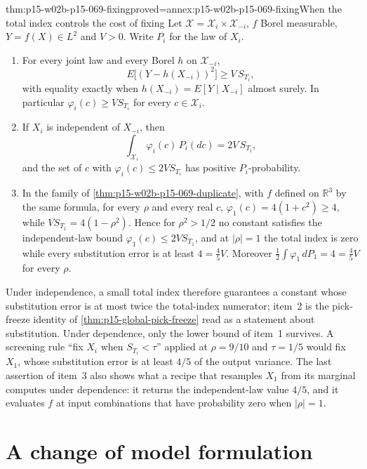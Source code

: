 \begin{hbtheorem}{thm:p15-w02b-p15-069-fixing}{proved=annex:p15-w02b-p15-069-fixing}{When the total index controls the cost of fixing}
Let \(\mathcal X=\mathcal X_i\times\mathcal X_{-i}\), \(f\) Borel
measurable, \(Y=f(X)\in L^2\) and \(V>0\). Write \(P_i\) for the law of
\(X_i\).
\begin{enumerate}
\item For every joint law and every Borel \(h\) on \(\mathcal X_{-i}\),
 \[
  E\bigl[(Y-h(X_{-i}))^2\bigr]\geq V\,S_{T_i},
 \]
 with equality exactly when \(h(X_{-i})=E[Y\mid X_{-i}]\) almost surely.
 In particular \(\varphi_i(c)\geq VS_{T_i}\) for every \(c\in\mathcal X_i\).
\item If \(X_i\) is independent of \(X_{-i}\), then
 \[
  \int_{\mathcal X_i}\varphi_i(c)\,P_i(dc)=2V\,S_{T_i},
 \]
 and the set of \(c\) with \(\varphi_i(c)\leq2VS_{T_i}\) has positive
 \(P_i\)-probability.
\item In the family of \cref{thm:p15-w02b-p15-069-duplicate}, with \(f\)
 defined on \(\mathbb R^3\) by the same formula, for every \(\rho\) and
 every real \(c\),
 \(\varphi_1(c)=4(1+c^2)\geq4\), while \(VS_{T_1}=4(1-\rho^2)\).
 Hence for \(\rho^2>1/2\) no constant satisfies the independent-law bound
 \(\varphi_1(c)\leq2VS_{T_1}\), and at \(|\rho|=1\) the total index is zero
 while every substitution error is at least \(4=\tfrac45V\).
 Moreover \(\tfrac12\int\varphi_1\,dP_1=4=\tfrac45V\) for every \(\rho\).
\end{enumerate}
\end{hbtheorem}

Under independence, a small total index therefore guarantees a constant
whose substitution error is at most twice the total-index numerator; item~2
is the pick-freeze identity of \cref{thm:p15-global-pick-freeze} read as a
statement about substitution. Under dependence, only the lower bound of
item~1 survives. A screening rule ``fix \(X_i\) when \(S_{T_i}<\tau\)''
applied at \(\rho=9/10\) and \(\tau=1/5\) would fix \(X_1\), whose
substitution error is at least \(4/5\) of the output variance. The last
assertion of item~3 also shows what a recipe that resamples \(X_1\) from its
marginal computes under dependence: it returns the independent-law value
\(4/5\), and it evaluates \(f\) at input combinations that have probability
zero when \(|\rho|=1\).

\section{A change of model formulation}

